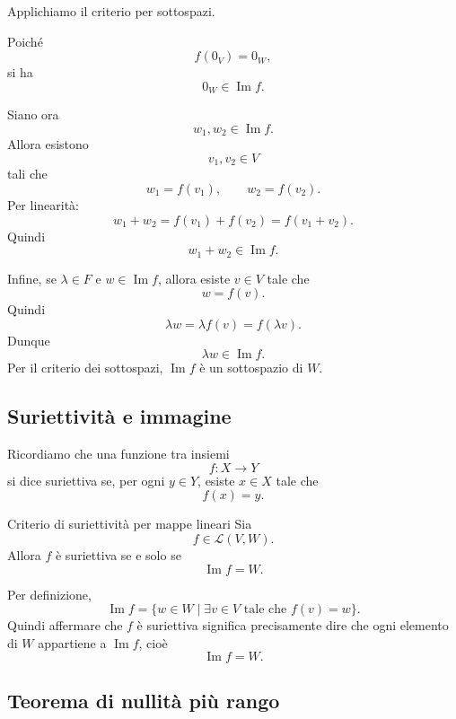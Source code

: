 \documentclass[a4paper]{article}
\begin{document}
\begin{snippetproof}{}
    Applichiamo il criterio per sottospazi.

    Poiché
    \[
        f(0_V)=0_W,
    \]
    si ha
    \[
        0_W\in\operatorname{Im}f.
    \]

    Siano ora
    \[
        w_1,w_2\in\operatorname{Im}f.
    \]
    Allora esistono
    \[
        v_1,v_2\in V
    \]
    tali che
    \[
        w_1=f(v_1),
        \qquad
        w_2=f(v_2).
    \]
    Per linearità:
    \[
        w_1+w_2
        =
        f(v_1)+f(v_2)
        =
        f(v_1+v_2).
    \]
    Quindi
    \[
        w_1+w_2\in\operatorname{Im}f.
    \]

    Infine, se \(\lambda\in F\) e \(w\in\operatorname{Im}f\), allora esiste \(v\in V\) tale che
    \[
        w=f(v).
    \]
    Quindi
    \[
        \lambda w
        =
        \lambda f(v)
        =
        f(\lambda v).
    \]
    Dunque
    \[
        \lambda w\in\operatorname{Im}f.
    \]
    Per il criterio dei sottospazi, \(\operatorname{Im}f\) è un sottospazio di \(W\).
\end{snippetproof}

\subsection{Suriettività e immagine}

Ricordiamo che una funzione tra insiemi
\[
    f:X\to Y
\]
si dice suriettiva se, per ogni \(y\in Y\), esiste \(x\in X\) tale che
\[
    f(x)=y.
\]

\begin{snippetproposition}{Criterio di suriettività per mappe lineari}
    Sia
    \[
        f\in\mathcal{L}(V,W).
    \]
    Allora \(f\) è suriettiva se e solo se
    \[
        \operatorname{Im}f=W.
    \]
\end{snippetproposition}

\begin{snippetproof}{}
    Per definizione,
    \[
        \operatorname{Im}f
        =
        \{w\in W\mid \exists v\in V \text{ tale che } f(v)=w\}.
    \]
    Quindi affermare che \(f\) è suriettiva significa precisamente dire che ogni elemento di \(W\) appartiene a \(\operatorname{Im}f\), cioè
    \[
        \operatorname{Im}f=W.
    \]
\end{snippetproof}

\subsection{Teorema di nullità più rango}
\end{document}
